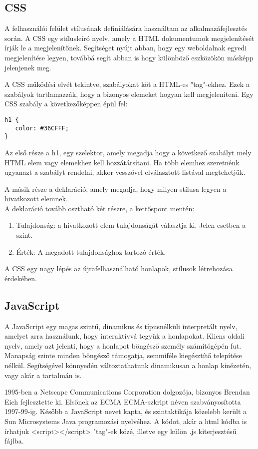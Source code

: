 \subsection{CSS}
A felhasználói felület stílusának definiálására használtam az alkalmazáfejlesztés során. A CSS egy stílusleíró nyelv, amely a HTML dokumentumok megjelenítését írják le a megjelenítőnek. Segítséget nyújt abban, hogy egy weboldalnak egyedi megjelenítése legyen, továbbá segít abban is hogy különböző eszközökön másképp jelenjenek meg. 

A CSS működési elvét tekintve, szabályokat köt a HTML-es "tag"-ekhez. Ezek a szabályok tartlamazzák, hogy a bizonyos elemeket hogyan kell megjeleníteni. Egy CSS szabály a következőképpen épül fel: 
\begin{verbatim}
h1 {
   color: #36CFFF; 
}
\end{verbatim}
Az első része a h1, egy szelektor, amely megadja hogy a következő szabályt mely HTML elem vagy elemekhez kell hozzátársítani. Ha több elemhez szeretnénk ugyanazt a szabályt rendelni, akkor vesszővel elválasztott listával megtehetjük. 

A másik része a deklaráció, amely megadja, hogy milyen stílusa legyen a hivatkozott elemnek. \\
A deklaráció tovább osztható két részre, a kettőspont mentén:
\begin{enumerate}
    \item Tulajdonság: a hivatkozott elem tulajdonságát választja ki. Jelen esetben a színt.
    \item Érték: A megadott tulajdonsághoz tartozó érték.
\end{enumerate}
A CSS egy nagy lépés az újrafelhasználható honlapok, stílusok létrehozása érdekében.

\subsection{JavaScript}
A JavaScript egy magas szintű, dinamikus és típusnélküli interpretált nyelv, 
amelyet arra használunk, hogy interaktívvá tegyük a honlapokat. Kliens oldali nyelv, amely azt jelenti, hogy a honlapot böngésző személy számítógépén fut. Manapság szinte minden böngésző támogatja, semmiféle kiegésztítő telepítése nélkül. Segítségével könnyedén változtathatunk dinamikusan a honlap kinézetén, vagy akár a tartalmán is. 

1995-ben a Netscape Communications Corporation dolgozója, bizonyos Brendan Eich fejlesztette ki. Elsőnek az ECMA ECMA-szkript néven szabványosította 1997-99-ig. Később a JavaScript nevet kapta, és szintaktikája közelebb került a Sun Microsystems Java programozási nyelvéhez. A kódot, akár a html kódba is írhatjuk <script></script> "tag"-ek közé, illetve egy külön .js kiterjesztésű fájlba.

